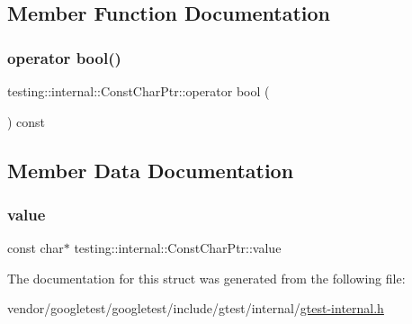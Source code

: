 \subsection{Member Function Documentation}
\mbox{\label{structtesting_1_1internal_1_1_const_char_ptr_a85c8174b5d4db8fe96863509ba767b27}} 
\subsubsection{\texorpdfstring{operator bool()}{operator bool()}}
{\footnotesize\ttfamily testing\+::internal\+::\+Const\+Char\+Ptr\+::operator bool (\begin{DoxyParamCaption}{ }\end{DoxyParamCaption}) const\hspace{0.3cm}{\ttfamily [inline]}}



\subsection{Member Data Documentation}
\mbox{\label{structtesting_1_1internal_1_1_const_char_ptr_adba40d23d5986904b605946f643cf26e}} 
\subsubsection{\texorpdfstring{value}{value}}
{\footnotesize\ttfamily const char$\ast$ testing\+::internal\+::\+Const\+Char\+Ptr\+::value}



The documentation for this struct was generated from the following file\+:\begin{DoxyCompactItemize}
\item 
vendor/googletest/googletest/include/gtest/internal/\hyperlink{gtest-internal_8h}{gtest-\/internal.\+h}\end{DoxyCompactItemize}
